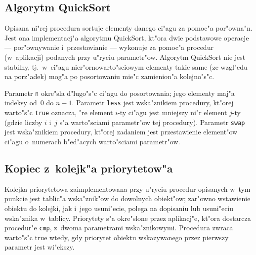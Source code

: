 \subsection{Algorytm QuickSort}

Opisana ni"rej procedura sortuje elementy danego ci"agu za pomoc"a por"owna"n.
Jest ona implementacj"a algorytmu QuickSort, kt"ora dwie podstawowe operacje
--- por"ownywanie i~przestawianie --- wykonuje za pomoc"a procedur
(w~aplikacji) podanych przy u"ryciu parametr"ow. Algorytm QuickSort
nie jest stabilny, tj.\ w~ci"agu nier"ornowarto"sciowym elementy
takie same (ze wzgl"edu na porz"adek) mog"a po posortowaniu mie"c
zamienion"a kolejno"s"c.

\vspace{\bigskipamount}
Parametr \texttt{n} okre"sla d"lugo"s"c ci"agu do posortowania;
jego elementy maj"a indeksy od~$0$ do $n-1$.
Parametr \texttt{less} jest wska"znikiem procedury, kt"orej warto"s"c
\texttt{true} oznacza, "re element $i$-ty ci"agu jest mniejszy ni"r
element $j$-ty (gdzie liczby $i$ i~$j$ s"a warto"sciami parametr"ow tej
procedury). Parametr \texttt{swap} jest wska"znikiem procedury, kt"orej
zadaniem jest przestawienie element"ow ci"agu o~numerach b"ed"acych
warto"sciami parametr"ow.


\newpage
\subsection{Kopiec z~kolejk"a priorytetow"a}

Kolejka priorytetowa zaimplementowana przy u"ryciu procedur opisanych w~tym
punkcie jest tablic"a wska"znik"ow do dowolnych obiekt"ow; zar"owno wstawienie
obiek\-tu do kolejki, jak i~jego usuni"ecie, polega na dopisaniu lub usuni"eciu
wska"znika w~tablicy. Priorytety s"a okre"slone przez aplikacj"e, kt"ora
dostarcza procedur"e \texttt{cmp}, z~dwoma parametrami wska"znikowymi.
Procedura zwraca warto"s"c true wtedy, gdy priorytet obiektu wskazywanego
przez pierwszy parametr jest wi"ekszy.

\vspace{\bigskipamount}


